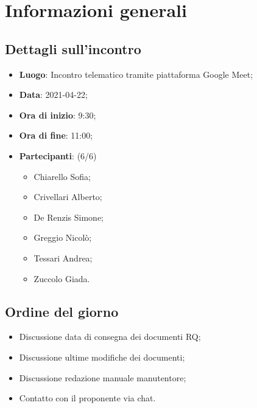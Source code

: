 \section{Informazioni generali}

\subsection{Dettagli sull'incontro}
\begin{itemize}
\item \textbf{Luogo}: Incontro telematico tramite piattaforma Google Meet;
\item \textbf{Data}: 2021-04-22;
\item \textbf{Ora di inizio}: 9:30;
\item \textbf{Ora di fine}: 11:00;
\item \textbf{Partecipanti}: (6/6) 
\begin{itemize}
	\item Chiarello Sofia;
	\item Crivellari Alberto;
	\item De Renzis Simone;
	\item Greggio Nicolò;
	\item Tessari Andrea;
	\item Zuccolo Giada.
\end{itemize}
\end{itemize}

\subsection{Ordine del giorno}
\begin{itemize}
	\item Discussione data di consegna dei documenti RQ;
	\item Discussione ultime modifiche dei documenti;
	\item Discussione redazione manuale manutentore;
	\item Contatto con il proponente via chat.
\end{itemize}


